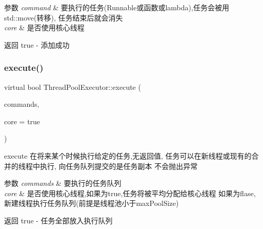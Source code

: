 \begin{DoxyParams}{参数}
{\em command} & 要执行的任务(Runnable或函数或lambda),任务会被用std\+::move(转移), 任务结束后就会消失 \\
\hline
{\em core} & 是否使用核心线程\\
\hline
\end{DoxyParams}
\begin{DoxyReturn}{返回}
true -\/ 添加成功 
\end{DoxyReturn}
\mbox{\label{classThreadPoolExecutor_a451bba3f90dbed2ba7e491ebc391b3c6}} 
\subsubsection{\texorpdfstring{execute()}{execute()}\hspace{0.1cm}{\footnotesize\ttfamily [3/3]}}
{\footnotesize\ttfamily virtual bool Thread\+Pool\+Executor\+::execute (\begin{DoxyParamCaption}\item[{\hyperlink{classBlockingQueue}{Blocking\+Queue}$<$ Runnable\+::sptr $>$ \&}]{commands,  }\item[{bool}]{core = {\ttfamily true} }\end{DoxyParamCaption})\hspace{0.3cm}{\ttfamily [virtual]}}



execute 在将来某个时候执行给定的任务,无返回值, 任务可以在新线程或现有的合并的线程中执行, 向任务队列提交的是任务副本 不会抛出异常 


\begin{DoxyParams}{参数}
{\em commands} & 要执行的任务队列 \\
\hline
{\em core} & 是否使用核心线程,如果为true,任务将被平均分配给核心线程 如果为flase,新建线程执行任务队列(前提是线程池小于max\+Pool\+Size)\\
\hline
\end{DoxyParams}
\begin{DoxyReturn}{返回}
true -\/ 任务全部放入执行队列 
\end{DoxyReturn}
\mbox{\label{classThreadPoolExecutor_ac9345329aa167200bec31951d2f5a690}} 
